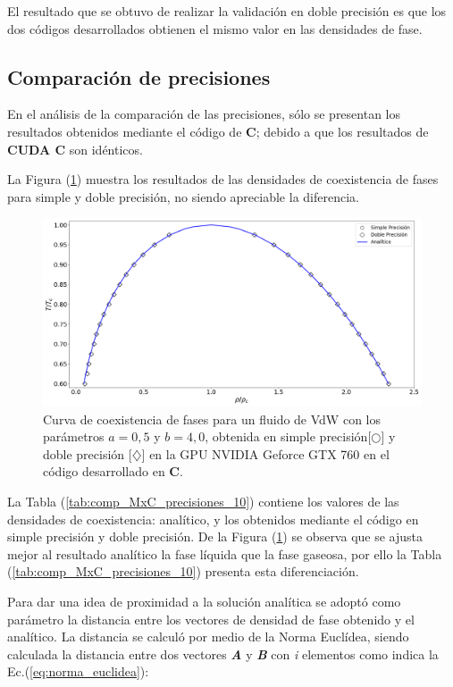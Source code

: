 El resultado que se obtuvo de realizar la validación en doble precisión es que los dos códigos desarrollados obtienen el mismo valor en las densidades de fase.

\newpage
\subsection{Comparación de precisiones}

En el análisis de la comparación de las precisiones, sólo se presentan los resultados obtenidos mediante el código de \textbf{C}; debido a que los resultados de \textbf{CUDA C} son idénticos.

La Figura (\ref{fig:v_760_MxC_c_comparacion}) muestra los resultados de las densidades de coexistencia de fases para simple y doble precisión, no siendo apreciable la diferencia.

\begin{figure}[h!]
	\centering
	\includegraphics[width=\textwidth]{figs/cap4/v_760_MxC_c_comparacion}
	\caption{Curva de coexistencia de fases para un fluido de VdW con los parámetros $a = 0,5 $ y $b = 4,0 $, obtenida en simple precisión[$\bigcirc$] y doble precisión [$\diamondsuit$] en la GPU NVIDIA Geforce GTX 760 en el código desarrollado en \textbf{C}.} 
	\label{fig:v_760_MxC_c_comparacion}	
\end{figure}


La Tabla (\ref{tab:comp_MxC_precisiones_10}) contiene los valores de las densidades de coexistencia: analítico, y los obtenidos mediante el código en simple precisión y doble precisión. De la Figura (\ref{fig:v_760_MxC_c_comparacion}) se observa que se ajusta mejor al resultado analítico la fase líquida que la fase gaseosa, por ello la Tabla (\ref{tab:comp_MxC_precisiones_10}) presenta esta diferenciación.

Para dar una idea de proximidad a la solución analítica se adoptó como parámetro la distancia entre los vectores de densidad de fase obtenido y el analítico. La distancia se calculó por medio de la Norma Euclídea, siendo calculada la distancia entre dos vectores \textbf{\textit{A}} y \textbf{\textit{B}} con \textit{i} elementos como indica la Ec.(\ref{eq:norma_euclidea}):

